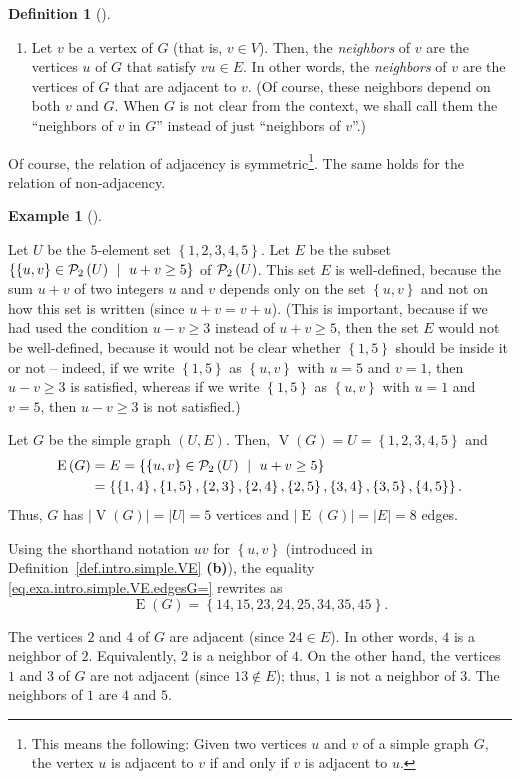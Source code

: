 \documentclass[numbers=enddot,12pt,final,onecolumn,notitlepage]{scrartcl}%
\theoremstyle{definition}
\newtheorem{defi}[theo]{Definition}
\newenvironment{definition}[1][]
{\begin{defi}[#1]\begin{leftbar}}
{\end{leftbar}\end{defi}}
\newtheorem{exam}[theo]{Example}
\newenvironment{example}[1][]
{\begin{exam}[#1]\begin{leftbar}}
{\end{leftbar}\end{exam}}
\newcommand{\powset}[2][]{\ifthenelse{\equal{#2}{}}{\mathcal{P}\left(#1\right)}{\mathcal{P}_{#1}\left(#2\right)}}
\newcommand{\set}[1]{\left\{ #1 \right\}}
\newcommand{\abs}[1]{\left| #1 \right|}
\newcommand{\tup}[1]{\left( #1 \right)}
\newcommand{\verts}[1]{\operatorname{V}\left( #1 \right)}
\newcommand{\edges}[1]{\operatorname{E}\left( #1 \right)}
\begin{document}
\begin{definition}
\begin{enumerate}
\item[\textbf{(d)}] Let $v$ be a vertex of $G$ (that is, $v \in V$).
Then, the \textit{neighbors} of $v$ are the vertices $u$ of $G$ that
satisfy $vu \in E$.
In other words, the \textit{neighbors} of $v$ are the vertices of
$G$ that are adjacent to $v$.
(Of course, these neighbors depend on both $v$ and
$G$. When $G$ is not clear from the context, we shall call them the
``neighbors of $v$ in $G$'' instead of just ``neighbors of $v$''.)

\end{enumerate}

\end{definition}

Of course, the relation of adjacency is symmetric\footnote{This means
the following: Given two vertices $u$ and $v$ of a simple graph $G$,
the vertex $u$ is adjacent to $v$ if and only if $v$ is adjacent to
$u$.}. The same holds for the relation of non-adjacency.

\begin{example} \label{exa.intro.simple.VE}
Let $U$ be the $5$-element set $\set{1,2,3,4,5}$. Let $E$ be the
subset $\set{\set{u,v} \in \powset[2]{U} \ \mid \ u + v \geq 5 }$
of $\powset[2]{U}$. This set $E$ is well-defined, because the sum
$u + v$ of two integers $u$ and $v$ depends only on the set
$\set{u,v}$ and not on how this set is written (since
$u + v = v + u$). (This is important, because if we had used the
condition $u - v \geq 3$ instead of $u + v \geq 5$, then the set $E$
would not be well-defined, because it would not be clear whether
$\set{1, 5}$ should be inside it or not -- indeed, if we write
$\set{1, 5}$ as $\set{u, v}$ with $u = 5$ and $v = 1$, then
$u - v \geq 3$ is satisfied, whereas if we write $\set{1, 5}$ as
$\set{u, v}$ with $u = 1$ and $v = 5$, then $u - v \geq 3$ is not
satisfied.)

Let $G$ be the simple graph $\tup{U, E}$. Then, $\verts{G} = U
= \set{1,2,3,4,5}$ and
\begin{align}
\edges{G} &= E
= \set{\set{u,v} \in \powset[2]{U} \ \mid \ u + v \geq 5 }
\nonumber \\
&= \set{\set{1,4}, \set{1,5},
        \set{2,3}, \set{2,4}, \set{2,5},
        \set{3,4}, \set{3,5},
        \set{4,5}} .
\label{eq.exa.intro.simple.VE.edgesG=}
\end{align}
Thus, $G$ has $\abs{\verts{G}} = \abs{U} = 5$ vertices and
$\abs{\edges{G}} = \abs{E} = 8$ edges.

Using the shorthand notation
$uv$ for $\set{u, v}$ (introduced in
Definition~\ref{def.intro.simple.VE} \textbf{(b)}), the equality
\eqref{eq.exa.intro.simple.VE.edgesG=} rewrites as
\[
\edges{G}
= \set{14, 15, 23, 24, 25, 34, 35, 45} .
\]

The vertices $2$ and $4$ of $G$ are adjacent (since $24 \in E$).
In other words, $4$ is a neighbor of $2$. Equivalently, $2$ is a
neighbor of $4$. On the other hand, the vertices $1$ and $3$ of $G$
are not adjacent (since $13 \notin E$); thus, $1$ is not a neighbor
of $3$. The neighbors of $1$ are $4$ and $5$.
\end{example}
\end{document}
